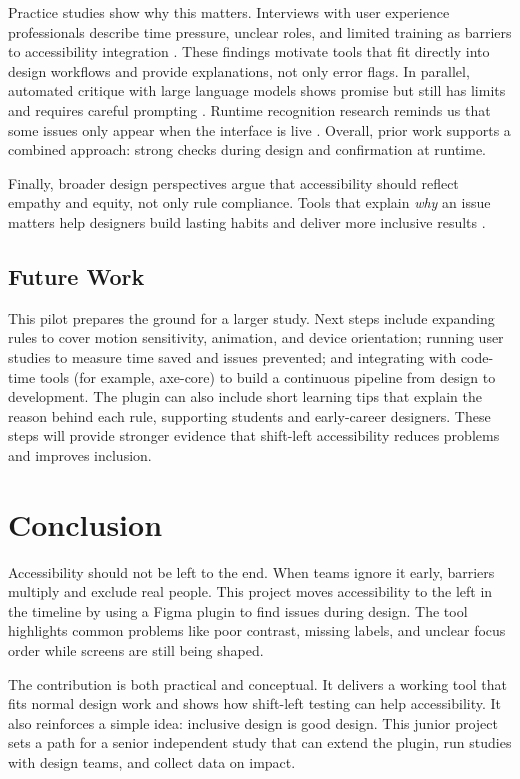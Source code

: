 \documentclass[12pt]{article}
\begin{document}
Practice studies show why this matters. Interviews with user experience professionals describe time pressure, unclear roles, and limited training as barriers to accessibility integration \cite{shi2023uxaccesspractice}. These findings motivate tools that fit directly into design workflows and provide explanations, not only error flags. In parallel, automated critique with large language models shows promise but still has limits and requires careful prompting \cite{duan2024mockupfeedback,duan2024uicrit}. Runtime recognition research reminds us that some issues only appear when the interface is live \cite{zhang2021screenrecognition}. Overall, prior work supports a combined approach: strong checks during design and confirmation at runtime.

Finally, broader design perspectives argue that accessibility should reflect empathy and equity, not only rule compliance. Tools that explain \emph{why} an issue matters help designers build lasting habits and deliver more inclusive results \cite{10.1145/3196709.3196813}.

\subsection{Future Work}
This pilot prepares the ground for a larger study. Next steps include expanding rules to cover motion sensitivity, animation, and device orientation; running user studies to measure time saved and issues prevented; and integrating with code-time tools (for example, axe-core) to build a continuous pipeline from design to development. The plugin can also include short learning tips that explain the reason behind each rule, supporting students and early-career designers. These steps will provide stronger evidence that shift-left accessibility reduces problems and improves inclusion.

\section{Conclusion}
Accessibility should not be left to the end. When teams ignore it early, barriers multiply and exclude real people. This project moves accessibility to the left in the timeline by using a Figma plugin to find issues during design. The tool highlights common problems like poor contrast, missing labels, and unclear focus order while screens are still being shaped.

The contribution is both practical and conceptual. It delivers a working tool that fits normal design work and shows how shift-left testing can help accessibility. It also reinforces a simple idea: inclusive design is good design. This junior project sets a path for a senior independent study that can extend the plugin, run studies with design teams, and collect data on impact.
\end{document}
